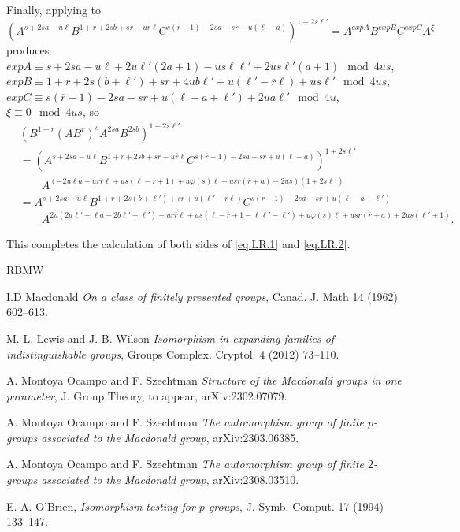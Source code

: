 \documentclass{amsart}
\theoremstyle{definition}
\theoremstyle{remark}
\begin{document}
Finally, applying \cite[Theorem 3.5]{MS3} to
\[
(A^{s + 2sa - u\ell} B^{1 + r + 2sb + sr - u\overline{r}\ell} C^{s(\overline{r} - 1) - 2sa - sr + u(\ell - a)})^{1 + 2s\ell'}
= A^{expA} B^{expB} C^{expC} A^{\xi}
\]
produces
$expA\equiv s + 2sa - u\ell + 2u\ell'(2a + 1) - us\ell \ell' + 2us\ell'(a + 1)\mod 4us$,
$expB\equiv 1 + r + 2s(b + \ell') + sr + 4ub\ell' + u(\ell' - \overline{r}\ell) + us\ell'\mod 4us$,
$expC\equiv s(\overline{r} - 1) - 2sa - sr + u(\ell - a + \ell') + 2ua\ell'\mod 4u$,
$\xi\equiv 0\mod 4us$, so
\begin{equation}\label{eq.R.2}
    \begin{split}
        &(B^{1+r} (AB^r)^s A^{2sa} B^{2sb})^{1 + 2s\ell'}\\
        &= (A^{s + 2sa - u\ell} B^{1 + r + 2sb + sr - u\overline{r}\ell} C^{s(\overline{r} - 1) - 2sa - sr + u(\ell - a)})^{1 + 2s\ell'}\\
        &\qquad A^{(-2u\ell a - ur\overline{r}\ell + us(\ell - \overline{r} + 1) + u\varphi(s)\ell + usr(\overline{r} + a) + 2us)(1 + 2s\ell')}\\
        &= A^{s + 2sa - u\ell} B^{1 + r + 2s(b + \ell') + sr + u(\ell' - \overline{r}\ell)} C^{s(\overline{r} - 1) - 2sa - sr + u(\ell - a + \ell')}\\
        &\qquad A^{2u(2a\ell' - \ell a - 2b\ell' + \ell') - ur\overline{r}\ell + us(\ell - \overline{r} + 1 - \ell \ell' - \ell') + u\varphi(s)\ell + usr(\overline{r} + a) + 2us(\ell' + 1)}.
    \end{split}
\end{equation}

This completes the calculation of both sides of \eqref{eq.LR.1} and \eqref{eq.LR.2}.



\begin{thebibliography}{RBMW}

    \small


 I.D Macdonald \emph{On a class of finitely presented groups},
Canad. J. Math 14 (1962) 602--613.


 M. L. Lewis and J. B. Wilson \emph{Isomorphism in expanding families of indistinguishable groups},
Groups Complex. Cryptol. 4 (2012) 73--110.


 A. Montoya Ocampo and F. Szechtman \emph{Structure of the Macdonald groups in one parameter}, J. Group Theory,
to appear, arXiv:2302.07079.

 A. Montoya Ocampo and F. Szechtman \emph{The automorphism group of finite $p$-groups associated to the Macdonald group}, arXiv:2303.06385.

 A. Montoya Ocampo and F. Szechtman \emph{The automorphism group of finite $2$-groups associated to the Macdonald group}, 
arXiv:2308.03510.

 E. A. O’Brien, \emph{Isomorphism testing for $p$-groups},
J. Symb. Comput. 17 (1994) 133--147.








\end{thebibliography}
\end{document}
